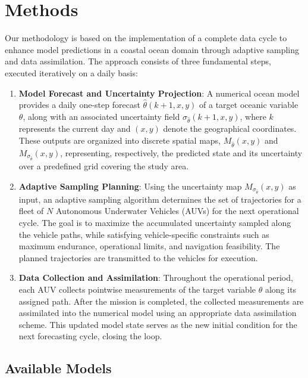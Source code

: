 
\section{Methods}

Our methodology is based on the implementation of a complete data cycle to enhance model predictions in a coastal ocean domain through adaptive sampling and data assimilation. The approach consists of three fundamental steps, executed iteratively on a daily basis:

\begin{enumerate}
    \item \textbf{Model Forecast and Uncertainty Projection}:  
    A numerical ocean model provides a daily one-step forecast $\hat{\theta}(k+1, x, y)$ of a target oceanic variable $\theta$, along with an associated uncertainty field $\sigma_{\hat{\theta}}(k+1, x, y)$, where $k$ represents the current day and $(x, y)$ denote the geographical coordinates. These outputs are organized into discrete spatial maps, $M_{\hat{\theta}}(x, y)$ and $M_{\sigma_{\hat{\theta}}}(x, y)$, representing, respectively, the predicted state and its uncertainty over a predefined grid covering the study area.
    
    \item \textbf{Adaptive Sampling Planning}:  
    Using the uncertainty map $M_{\sigma_{\hat{\theta}}}(x, y)$ as input, an adaptive sampling algorithm determines the set of trajectories for a fleet of $N$ Autonomous Underwater Vehicles (AUVs) for the next operational cycle. The goal is to maximize the accumulated uncertainty sampled along the vehicle paths, while satisfying vehicle-specific constraints such as maximum endurance, operational limits, and navigation feasibility. The planned trajectories are transmitted to the vehicles for execution.

    \item \textbf{Data Collection and Assimilation}:  
    Throughout the operational period, each AUV collects pointwise measurements of the target variable $\theta$ along its assigned path. After the mission is completed, the collected measurements are assimilated into the numerical model using an appropriate data assimilation scheme. This updated model state serves as the new initial condition for the next forecasting cycle, closing the loop.
\end{enumerate}



\subsection{Available Models}
